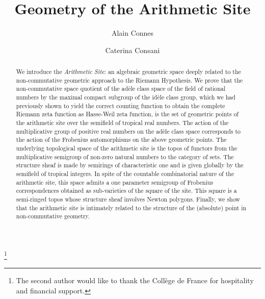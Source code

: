 \documentclass[noams,lp]{compositio}
\newcommand*{\code}[1]{{\mdseries\texttt{#1}}}
\begin{document}
\title{Geometry of the  Arithmetic   Site}
\author{Alain Connes}
\address{Coll\`ege de France,
3 rue d'Ulm, Paris F-75005 France\newline
I.H.E.S. and Ohio State University.}
%
\author{Caterina Consani}
\address{Department of Mathematics, The Johns Hopkins
University\newline Baltimore, MD 21218 USA.}
%
\thanks{The second author would like to thank the Coll\`ege de France for hospitality and financial support.
}

\begin{abstract}
We introduce  the {\em Arithmetic Site}: an algebraic geometric space deeply related to the non-commutative geometric approach to the Riemann Hypothesis.
We prove that the non-commutative space quotient of the ad\` ele class space of the field of  rational numbers by the maximal compact subgroup of the id\`ele class group,
which we had previously shown to yield the correct counting function to obtain the complete Riemann zeta function as Hasse-Weil zeta function, is  the set of geometric points of the arithmetic site over the  semifield of tropical real numbers. The action of the multiplicative group of positive real numbers on the ad\`ele class space corresponds to the action of the Frobenius automorphisms  on the above geometric points.  The underlying topological space of the arithmetic site is the  topos  of functors from the multiplicative semigroup  of non-zero natural numbers to the category  of sets. The  structure sheaf is made by semirings of characteristic one and is given globally  by the semifield of tropical integers.
 In spite of the countable  combinatorial nature of the arithmetic site, this space admits a one parameter semigroup  of Frobenius correspondences obtained  as sub-varieties of the square of the site.  This square   is  a semi-ringed topos whose structure sheaf involves Newton polygons. Finally, we show that the arithmetic site is intimately related to the structure of the (absolute) point in non-commutative geometry.\end{abstract}
\end{document}
